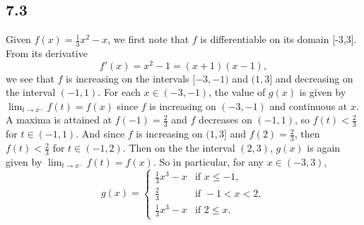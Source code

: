 \documentclass[12pt]{article}
\newcommand{\ds}{\displaystyle}
\begin{document}
\subsection*{7.3}

Given $f(x)=\ds\frac13 x^2 - x$, we first note that $f$ is differentiable on its domain [-3,3]. From its derivative
\[f'(x) = x^2-1 = (x+1)(x-1),\]
we see that $f$ is increasing on the intervals $[-3,-1)$ and $(1,3]$ and decreasing on the interval $(-1,1)$. For each $x\in(-3,-1)$, the value of $g(x)$ is given by $\ds\lim_{t\to x^-}f(t) = f(x)$ since $f$ is increasing on $(-3,-1)$ and continuous at $x$. A maxima is attained at $f(-1)=\ds\frac23$ and $f$ decreases on $(-1,1)$, so $f(t)<\ds\frac23$ for $t\in(-1,1)$. And since $f$ is increasing on $(1,3]$ and $f(2)=\ds\frac23$, then $f(t)<\ds\frac23$ for $t\in(-1,2)$. Then on the the interval $(2,3)$, $g(x)$ is again given by $\ds\lim_{t\to x^-}f(t)=f(x)$. So in particular, for any $x\in(-3,3)$,
\[g(x) =
    \begin{cases}
        \frac13x^3-x &\text{if } x \leq -1, \\[1em]
        \frac23      &\text{if } -1< x< 2, \\[1em]
        \frac13x^3-x &\text{if } 2 \leq x.
    \end{cases}
\]
\end{document}
